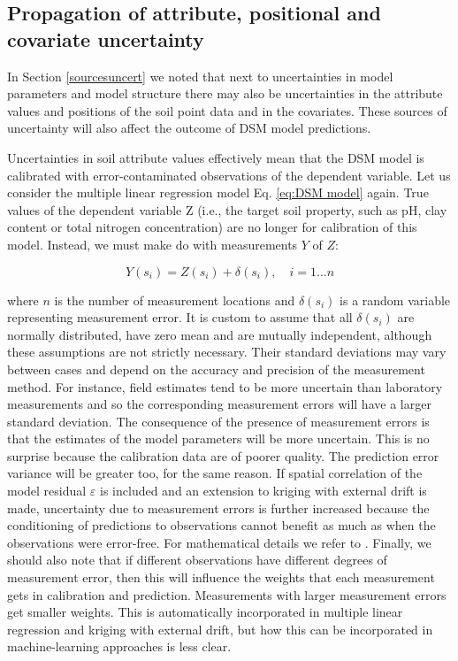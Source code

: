 \documentclass[10pt,b5paper,]{book}
\theoremstyle{definition}
\theoremstyle{definition}
\theoremstyle{definition}
\theoremstyle{remark}
\begin{document}
\hypertarget{propUncertainty}{%
\subsection{Propagation of attribute, positional and covariate
uncertainty}\label{propUncertainty}}

In Section \ref{sourcesuncert} we noted that next to uncertainties in
model parameters and model structure there may also be uncertainties in
the attribute values and positions of the soil point data and in the
covariates. These sources of uncertainty will also affect the outcome of
DSM model predictions.

Uncertainties in soil attribute values effectively mean that the DSM
model is calibrated with error-contaminated observations of the
dependent variable. Let us consider the multiple linear regression model
Eq. \ref{eq:DSM model} again. True values of the dependent variable Z
(i.e., the target soil property, such as pH, clay content or total
nitrogen concentration) are no longer for calibration of this model.
Instead, we must make do with measurements \(Y\) of \(Z\):

\begin{equation}
Y(s_i) = Z(s_i) + \delta(s_i), \quad i = 1 \dots n
\end{equation}

where \(n\) is the number of measurement locations and \({\delta(s_i)}\)
is a random variable representing measurement error. It is custom to
assume that all \({\delta(s_i)}\) are normally distributed, have zero
mean and are mutually independent, although these assumptions are not
strictly necessary. Their standard deviations may vary between cases and
depend on the accuracy and precision of the measurement method. For
instance, field estimates tend to be more uncertain than laboratory
measurements and so the corresponding measurement errors will have a
larger standard deviation. The consequence of the presence of
measurement errors is that the estimates of the model parameters will be
more uncertain. This is no surprise because the calibration data are of
poorer quality. The prediction error variance will be greater too, for
the same reason. If spatial correlation of the model residual
\({\varepsilon}\) is included and an extension to kriging with external
drift is made, uncertainty due to measurement errors is further
increased because the conditioning of predictions to observations cannot
benefit as much as when the observations were error-free. For
mathematical details we refer to \cite{cressie1993statistics}. Finally,
we should also note that if different observations have different
degrees of measurement error, then this will influence the weights that
each measurement gets in calibration and prediction. Measurements with
larger measurement errors get smaller weights. This is automatically
incorporated in multiple linear regression and kriging with external
drift, but how this can be incorporated in machine-learning approaches
is less clear.
\end{document}

